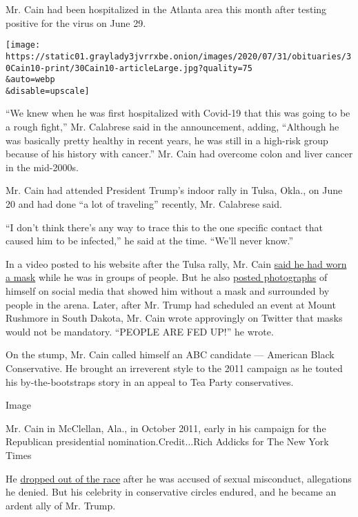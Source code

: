 Mr. Cain had been hospitalized in the Atlanta area this month after
testing positive for the virus on June 29.

\texttt{[image: https://static01.graylady3jvrrxbe.onion/images/2020/07/31/obituaries/30Cain10-print/30Cain10-articleLarge.jpg?quality=75\\\&auto=webp\\\&disable=upscale]}

``We knew when he was first hospitalized with Covid-19 that this was
going to be a rough fight,'' Mr. Calabrese said in the announcement,
adding, ``Although he was basically pretty healthy in recent years, he
was still in a high-risk group because of his history with cancer.'' Mr.
Cain had overcome colon and liver cancer in the mid-2000s.

Mr. Cain had attended President Trump's indoor rally in Tulsa, Okla., on
June 20 and had done ``a lot of traveling'' recently, Mr. Calabrese
said.

``I don't think there's any way to trace this to the one specific
contact that caused him to be infected,'' he said at the time. ``We'll
never know.''

In a video posted to his website after the Tulsa rally, Mr. Cain
\href{https://hermancain.com/trump-tulsa-rally-i-was-there/?utm_source=twitter\&utm_medium=thenewvoice\&utm_content=2020-06-22}{said
he had worn a mask} while he was in groups of people. But he also
\href{https://twitter.com/THEHermanCain/status/1274489632886075398?s=20}{posted
photographs} of himself on social media that showed him without a mask
and surrounded by people in the arena. Later, after Mr. Trump had
scheduled an event at Mount Rushmore in South Dakota, Mr. Cain wrote
approvingly on Twitter that masks would not be mandatory. ``PEOPLE ARE
FED UP!'' he wrote.

On the stump, Mr. Cain called himself an ABC candidate --- American
Black Conservative. He brought an irreverent style to the 2011 campaign
as he touted his by-the-bootstraps story in an appeal to Tea Party
conservatives.

Image

Mr. Cain in McClellan, Ala., in October 2011, early in his campaign for
the Republican presidential nomination.Credit...Rich Addicks for The New
York Times

He
\href{https://www.nytimes3xbfgragh.onion/2011/12/04/us/politics/herman-cain-suspends-his-presidential-campaign.html}{dropped
out of the race} after he was accused of sexual misconduct, allegations
he denied. But his celebrity in conservative circles endured, and he
became an ardent ally of Mr. Trump.

